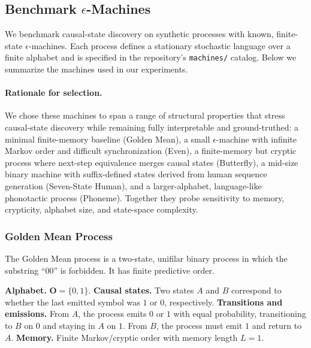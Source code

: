 
\subsection{Benchmark $\epsilon$-Machines}
\label{app:machines}

We benchmark causal-state discovery on synthetic processes with known, finite-state $\epsilon$-machines. Each process defines a stationary stochastic language over a finite alphabet and is specified in the repository's \texttt{machines/} catalog. Below we summarize the machines used in our experiments.

\paragraph{Rationale for selection.}
We chose these machines to span a range of structural properties that stress causal-state discovery while remaining fully interpretable and ground-truthed: a minimal finite-memory baseline (Golden Mean), a small $\epsilon$-machine with infinite Markov order and difficult synchronization (Even), a finite-memory but cryptic process where next-step equivalence merges causal states (Butterfly), a mid-size binary machine with suffix-defined states derived from human sequence generation (Seven-State Human), and a larger-alphabet, language-like phonotactic process (Phoneme). Together they probe sensitivity to memory, crypticity, alphabet size, and state-space complexity.

\subsubsection{Golden Mean Process}
The Golden Mean process is a two-state, unifilar binary process in which the substring ``00'' is forbidden. It has finite predictive order.

\textbf{Alphabet.} $\mathbf{O}=\{0,1\}$.  
\textbf{Causal states.} Two states $A$ and $B$ correspond to whether the last emitted symbol was $1$ or $0$, respectively.  
\textbf{Transitions and emissions.} From $A$, the process emits $0$ or $1$ with equal probability, transitioning to $B$ on $0$ and staying in $A$ on $1$. From $B$, the process must emit $1$ and return to $A$.  
\textbf{Memory.} Finite Markov/cryptic order with memory length $L=1$.

